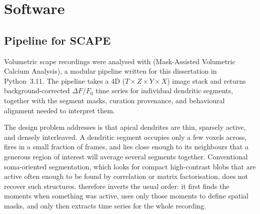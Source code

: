 \section{Software}\label{section:methods:software}


	\subsection{Pipeline for SCAPE}\label{section:methods:software:scape}

		Volumetric \acrshort{scape} recordings were analysed with \mavca{}
		(Mask-Assisted Volumetric Calcium Analysis), a modular pipeline written
		for this dissertation in Python~3.11.
		The pipeline takes a 4D ($T \times Z \times Y \times X$) image stack and
		returns background-corrected $\Delta F/F_0$ time series for individual
		dendritic segments, together with the segment masks, curation
		provenance, and behavioural alignment needed to interpret them.

		The design problem \mavca{} addresses is that apical dendrites are thin,
		sparsely active, and densely interleaved.
		A dendritic segment occupies only a few voxels across, fires in a small
		fraction of frames, and lies close enough to its neighbours that a
		generous region of interest will average several segments together.
		Conventional soma-oriented segmentation, which looks for compact
		high-contrast blobs that are active often enough to be found by
		correlation or matrix factorisation, does not recover such structures.
		\mavca{} therefore inverts the usual order: it first finds the moments
		when something was active, uses only those moments to define spatial
		masks, and only then extracts time series for the whole recording.

